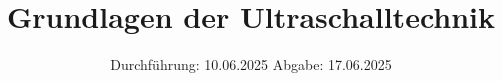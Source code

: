

\subject{US1}
\title{Grundlagen der Ultraschalltechnik}
\date{%
  Durchführung: 10.06.2025
  \hspace{3em}
  Abgabe: 17.06.2025
}



\maketitle
\thispagestyle{empty}
\tableofcontents
\newpage






\printbibliography{}


